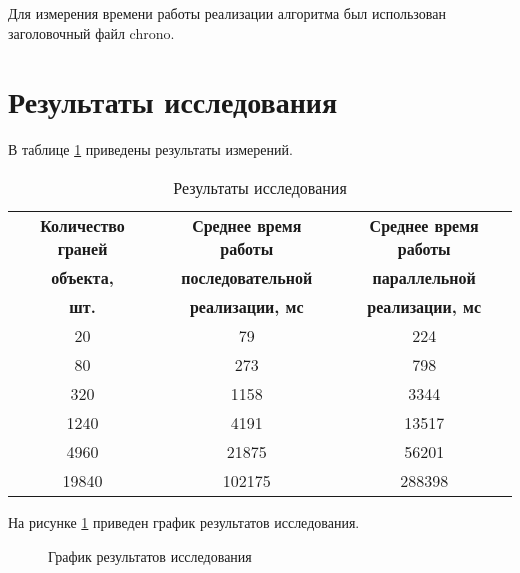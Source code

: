 Для измерения времени работы реализации алгоритма был использован заголовочный файл chrono.

\section{Результаты исследования}

В таблице \ref{restable} приведены результаты измерений.

\begin{table}[H]
	\begin{center}
		\caption{\label{restable}Результаты исследования}
		\begin{tabular}{|c|c|c|}
			\hline
			\bf{Количество граней} & \bf{Среднее время работы} & \bf{Среднее время работы}\\
			\bf{объекта,} & \bf{последовательной} & \bf{параллельной}\\
			\bf{шт.} & \bf{реализации, мс} & \bf{реализации, мс}\\
			\hline
			20 & 79 & 224\\
			\hline
			80 & 273 & 798\\
			\hline
			320 & 1158 & 3344\\
			\hline
			1240 & 4191 & 13517\\
			\hline
			4960 & 21875 & 56201\\
			\hline
			19840 & 102175 & 288398\\
			\hline
		\end{tabular}
	\end{center}
\end{table}

На рисунке \ref{resgraph} приведен график результатов исследования.

\begin{figure}[H]
	\begin{center}
		\caption{\label{resgraph}График результатов исследования}
	\end{center}
\end{figure}



